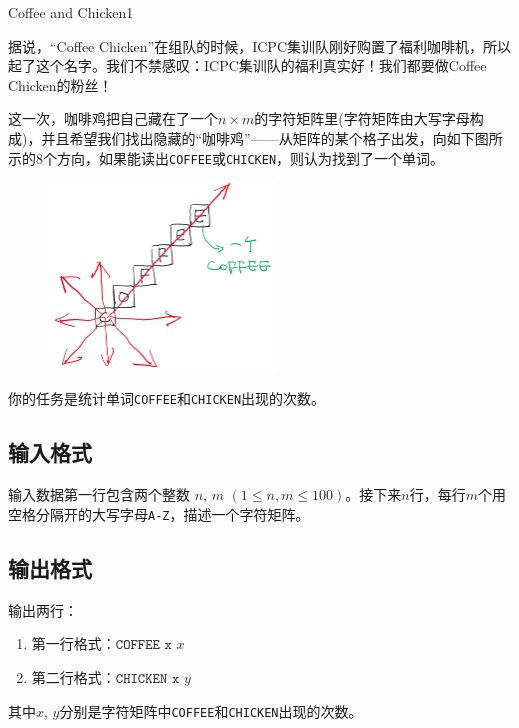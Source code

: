 \begin{Problem}{Coffee and Chicken}{1}

据说，“Coffee Chicken”在组队的时候，ICPC集训队刚好购置了福利咖啡机，所以起了这个名字。我们不禁感叹：ICPC集训队的福利真实好！我们都要做Coffee Chicken的粉丝！

这一次，咖啡鸡把自己藏在了一个$n\times m$的字符矩阵里(字符矩阵由大写字母构成)，并且希望我们找出隐藏的“咖啡鸡”——从矩阵的某个格子出发，向如下图所示的8个方向，如果能读出\texttt{COFFEE}或\texttt{CHICKEN}，则认为找到了一个单词。

\begin{figure}[h]
  \center
  \includegraphics[width=6cm]{src/cac/coffeechicken.png}
\end{figure}

你的任务是统计单词\texttt{COFFEE}和\texttt{CHICKEN}出现的次数。

\subsection*{输入格式}

输入数据第一行包含两个整数 $n$, $m$ $(1\le n,m\le 100)$。接下来$n$行，每行$m$个用空格分隔开的大写字母\texttt{A-Z}，描述一个字符矩阵。

\subsection*{输出格式}

输出两行：

\begin{enumerate}
\item 第一行格式：$\texttt{COFFEE x $x$}$
\item 第二行格式：$\texttt{CHICKEN x $y$}$
\end{enumerate}

其中$x$, $y$分别是字符矩阵中\texttt{COFFEE}和\texttt{CHICKEN}出现的次数。


\end{Problem}

